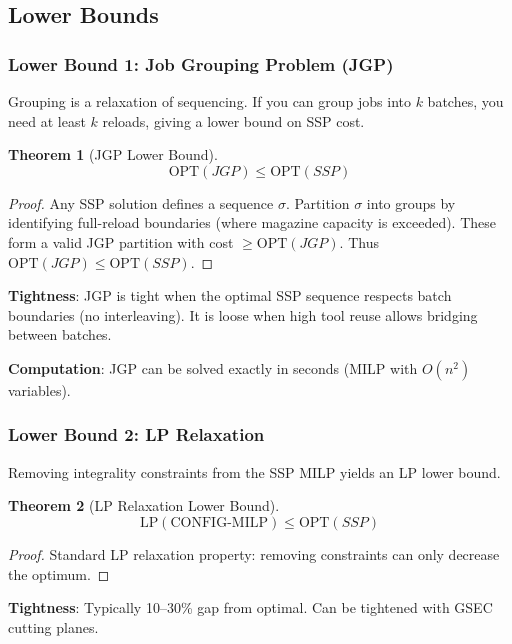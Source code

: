 \documentclass[12pt]{article}
\newtheorem{theorem}{Theorem}[section]
\begin{document}
	\subsection{Lower Bounds}
	
	\subsubsection{Lower Bound 1: Job Grouping Problem (JGP)}
	
	\begin{intuitionbox}
		Grouping is a relaxation of sequencing. If you can group jobs into $k$ batches, you need at least $k$ reloads, giving a lower bound on SSP cost.
	\end{intuitionbox}
	
	\begin{theorem}[JGP Lower Bound]
		\label{thm:jgp_lb}
		$$\text{OPT}(JGP) \le \text{OPT}(SSP)$$
	\end{theorem}
	\begin{proof}
		Any SSP solution defines a sequence $\sigma$. Partition $\sigma$ into groups by identifying full-reload boundaries (where magazine capacity is exceeded). These form a valid JGP partition with cost $\ge \text{OPT}(JGP)$. Thus $\text{OPT}(JGP) \le \text{OPT}(SSP)$.
	\end{proof}
	
	\textbf{Tightness}: JGP is tight when the optimal SSP sequence respects batch boundaries (no interleaving). It is loose when high tool reuse allows bridging between batches.
	
	\textbf{Computation}: JGP can be solved exactly in seconds (MILP with $O(n^2)$ variables).
	
	\subsubsection{Lower Bound 2: LP Relaxation}
	
	Removing integrality constraints from the SSP MILP yields an LP lower bound.
	
	\begin{theorem}[LP Relaxation Lower Bound]
		$$\text{LP}(\text{CONFIG-MILP}) \le \text{OPT}(SSP)$$
	\end{theorem}
	\begin{proof}
		Standard LP relaxation property: removing constraints can only decrease the optimum.
	\end{proof}
	
	\textbf{Tightness}: Typically 10--30\% gap from optimal. Can be tightened with GSEC cutting planes.
	
\end{document}
